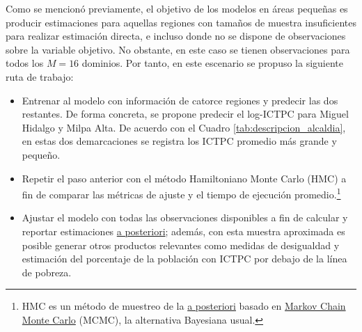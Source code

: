 \documentclass[11pt]{article}
\begin{document}
Como se mencionó previamente, el objetivo de los modelos en áreas pequeñas es producir estimaciones para aquellas regiones con tamaños de muestra insuficientes para realizar estimación directa, e incluso donde no se dispone de observaciones sobre la variable objetivo. No obstante, en este caso se tienen observaciones para todos los $M=16$ dominios. Por tanto, en este escenario se propuso la siguiente ruta de trabajo:
\begin{itemize}
\item Entrenar al modelo con información de catorce regiones y predecir las dos restantes. De forma concreta, se propone predecir el log-ICTPC para Miguel Hidalgo y Milpa Alta. De acuerdo con el Cuadro \ref{tab:descripcion_alcaldia}, en estas dos demarcaciones se registra los ICTPC promedio más grande y pequeño.
\item Repetir el paso anterior con el método Hamiltoniano Monte Carlo (HMC) a fin de comparar las métricas de ajuste y el tiempo de ejecución promedio.\footnote{HMC es un método de muestreo de la \underline{a posteriori} basado en \underline{Markov Chain Monte Carlo} (MCMC), la alternativa Bayesiana usual.}
\item Ajustar el modelo con todas las observaciones disponibles a fin de calcular y reportar estimaciones \underline{a posteriori}; además, con esta muestra aproximada es posible generar otros productos relevantes como medidas de desigualdad y estimación del porcentaje de la población con ICTPC por debajo de la línea de pobreza.
\end{itemize}
\end{document}

